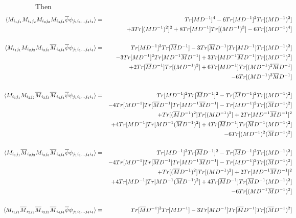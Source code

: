 \documentclass[a4paper,10pt]{report}
\newcommand{\ol}[1]{\overline{#1}}
\newcommand{\Mb}{\ol{M}}
\newcommand{\mv}[1]{\langle #1 \rangle}
\newcommand{\ppb}{\ol{\psi}\psi}
\newcommand{\D}{D^{-1}}
\begin{document}
\hspace*{-15mm}\noindent Then
\begin{eqnarray}
\hspace*{-19mm}\mv{M_{i_1j_1}M_{i_2j_2}M_{i_3j_3}M_{i_4j_4} \ppb_{j_1i_1...j_4i_4}} &=& 
Tr[M\D]^4 - 6 Tr[M\D]^2Tr[(M\D)^2]  \nonumber\\
&& + 3 Tr[(M\D)^2]^2 + 8 Tr[M\D]Tr[(M\D)^3] - 6 Tr[(M\D)^4]\nonumber\\
\nonumber\\
\hspace*{-19mm}\mv{M_{i_1j_1}M_{i_2j_2}M_{i_3j_3}\Mb_{i_4j_4} \ppb_{j_1i_1...j_4i_4}} &=&
Tr[M\D]^3 Tr[\Mb\D] - 3 Tr[\Mb\D]Tr[M\D]Tr[(M\D)^2] \nonumber\\
&& - 3 Tr[M\D]^2Tr[M\D\Mb\D] + 3 Tr[M\D\Mb\D]Tr[(M\D)^2] \nonumber\\
&&+ 2 Tr[\Mb\D]Tr[(M\D)^3]+ 6 Tr[M\D]Tr[(M\D)^2\Mb\D]\nonumber\\
&&  - 6 Tr[(M\D)^3\Mb\D]\nonumber\\
\nonumber\\
\hspace*{-19mm}\mv{M_{i_1j_1}M_{i_2j_2}\Mb_{i_3j_3}\Mb_{i_4j_4} \ppb_{j_1i_1...j_4i_4}} &=&
Tr[M\D]^2 Tr[\Mb\D]^2 - Tr[\Mb\D]^2Tr[(M\D)^2]\nonumber\\
&& - 4 Tr[M\D]Tr[\Mb\D]Tr[M\D\Mb\D] - Tr[M\D]^2Tr[(\Mb\D)^2] \nonumber\\
&& + Tr[(\Mb\D)^2]Tr[(M\D)^2] + 2 Tr[M\D\Mb\D]^2 \nonumber \\
&& + 4 Tr[M\D]Tr[M\D(\Mb\D)^2] + 4 Tr[\Mb\D]Tr[\Mb\D(M\D)^2] \nonumber\\
&& - 6 Tr[(M\D)^2(\Mb\D)^2]\nonumber\\
\nonumber\\
\hspace*{-19mm}\mv{M_{i_1j_1}\Mb_{i_2j_2}M_{i_3j_3}\Mb_{i_4j_4} \ppb_{j_1i_1...j_4i_4}} &=&
Tr[M\D]^2 Tr[\Mb\D]^2 - Tr[\Mb\D]^2Tr[(M\D)^2]\nonumber\\
&& - 4 Tr[M\D]Tr[\Mb\D]Tr[M\D\Mb\D] - Tr[M\D]^2Tr[(\Mb\D)^2] \nonumber\\
&& + Tr[(\Mb\D)^2]Tr[(M\D)^2] + 2 Tr[M\D\Mb\D]^2 \nonumber \\
&& + 4 Tr[M\D]Tr[M\D(\Mb\D)^2] + 4 Tr[\Mb\D]Tr[\Mb\D(M\D)^2] \nonumber\\
&& - 6 Tr[(M\D\Mb\D)^2]\nonumber\\
\nonumber\\
\hspace*{-19mm}\mv{M_{i_1j_1}\Mb_{i_2j_2}\Mb_{i_3j_3}\Mb_{i_4j_4} \ppb_{j_1i_1...j_4i_4}} &=&
Tr[\Mb\D]^3 Tr[M\D] - 3 Tr[M\D]Tr[\Mb\D]Tr[(\Mb\D)^2] \nonumber\\

\end{eqnarray}
\end{document}
